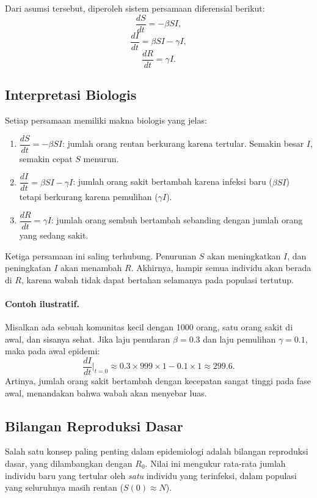 \documentclass{bukumjh}
\begin{document}
Dari asumsi tersebut, diperoleh sistem persamaan diferensial berikut:
\[
\frac{dS}{dt} = -\beta SI,
\]
\[
\frac{dI}{dt} = \beta SI - \gamma I,
\]
\[
\frac{dR}{dt} = \gamma I.
\]

\subsection{Interpretasi Biologis}

Setiap persamaan memiliki makna biologis yang jelas:
\begin{enumerate}
    \item $\dfrac{dS}{dt} = -\beta SI$: jumlah orang rentan berkurang karena tertular. Semakin besar $I$, semakin cepat $S$ menurun.
    \item $\dfrac{dI}{dt} = \beta SI - \gamma I$: jumlah orang sakit bertambah karena infeksi baru ($\beta SI$) tetapi berkurang karena pemulihan ($\gamma I$).
    \item $\dfrac{dR}{dt} = \gamma I$: jumlah orang sembuh bertambah sebanding dengan jumlah orang yang sedang sakit.
\end{enumerate}

Ketiga persamaan ini saling terhubung. Penurunan $S$ akan meningkatkan $I$, dan peningkatan $I$ akan menambah $R$. Akhirnya, hampir semua individu akan berada di $R$, karena wabah tidak dapat bertahan selamanya pada populasi tertutup.

\paragraph{Contoh ilustratif.}  
Misalkan ada sebuah komunitas kecil dengan 1000 orang, satu orang sakit di awal, dan sisanya sehat. Jika laju penularan $\beta=0.3$ dan laju pemulihan $\gamma=0.1$, maka pada awal epidemi:
\[
\frac{dI}{dt} \bigg|_{t=0} \approx 0.3 \times 999 \times 1 - 0.1 \times 1 \approx 299.6.
\]
Artinya, jumlah orang sakit bertambah dengan kecepatan sangat tinggi pada fase awal, menandakan bahwa wabah akan menyebar luas.

\subsection{Bilangan Reproduksi Dasar}

Salah satu konsep paling penting dalam epidemiologi adalah {\jsg bilangan reproduksi dasar}, yang dilambangkan dengan $R_0$. Nilai ini mengukur rata-rata jumlah individu baru yang tertular oleh \emph{satu} individu yang terinfeksi, dalam populasi yang seluruhnya masih rentan ($S(0) \approx N$).
\end{document}
